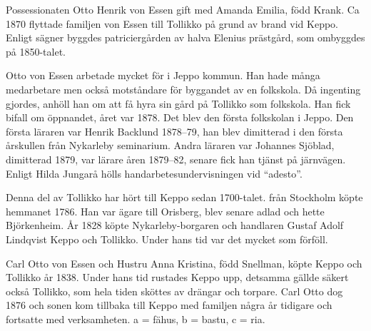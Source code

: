 Possessionaten Otto Henrik von Essen gift med Amanda Emilia, född Krank. Ca 1870 flyttade familjen von Essen till Tollikko på grund av brand vid Keppo. Enligt sägner byggdes patriciergården av halva Elenius prästgård, som ombyggdes på 1850-talet.

Otto von Essen arbetade mycket för  i Jeppo kommun. Han hade många medarbetare men också motståndare för byggandet av en folkskola. Då ingenting gjordes, anhöll han om att få hyra sin gård på Tollikko som folkskola. Han fick bifall om öppnandet, året var 1878. Det blev den första folkskolan i Jeppo. Den första läraren var Henrik Backlund 1878--79, han blev dimitterad i den första årskullen från Nykarleby seminarium. Andra läraren var Johannes Sjöblad, dimitterad 1879, var lärare åren 1879--82, senare fick han tjänst på järnvägen. Enligt Hilda Jungarå hölls handarbetesundervisningen vid ``adesto''.

Denna del av Tollikko har hört till Keppo sedan 1700-talet.  från Stockholm köpte hemmanet 1786. Han var ägare till Orisberg, blev senare adlad och hette Björkenheim. År 1828 köpte Nykarleby-borgaren och handlaren Gustaf Adolf Lindqvist Keppo och Tollikko. Under hans tid var det mycket som förföll.


%
Carl Otto von Essen och Hustru Anna Kristina, född Snellman, köpte Keppo och Tollikko år 1838. Under hans tid rustades Keppo upp, detsamma gällde säkert också Tollikko, som hela tiden sköttes av drängar och torpare. Carl Otto dog 1876 och sonen kom tillbaka till Keppo med familjen några år tidigare och fortsatte med 	verksamheten. a = fähus, b = bastu, c = ria.



%



